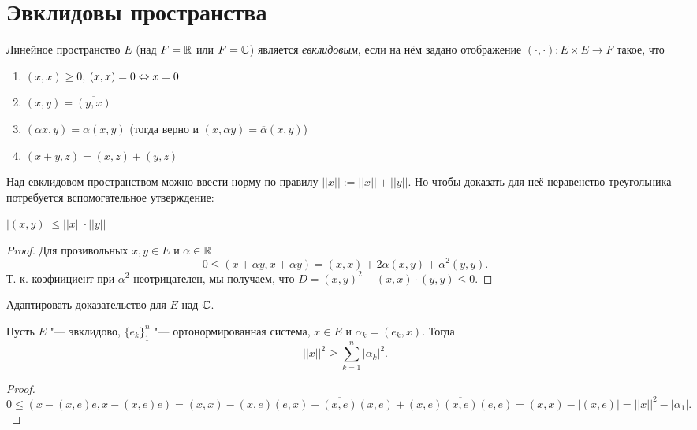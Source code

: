 \documentclass[main]{subfiles}
\begin{document}
\section{Эвклидовы пространства}
\begin{definition}
  Линейное пространство \( E \) (над \( F = \mathbb{R} \) или \( F = \mathbb{C} \))
  является \emph{евклидовым}, если на нём задано отображение
  \( (\cdot, \cdot) : E \times E \to F \) такое, что
  \begin{enumerate}
    \item \( (x, x) \ge 0 \), \( (x, x) = 0 \Leftrightarrow x = 0 \)
    \item \( (x, y) = \overline{(y, x)} \)
    \item \( (\alpha x, y) = \alpha (x, y) \)
      (тогда верно и \( (x, \alpha y) = \overline{\alpha} (x, y) \))
    \item \( (x + y, z) = (x, z) + (y, z) \)
  \end{enumerate}
\end{definition}

Над евклидовом пространством можно ввести норму
по правилу \( ||x|| := ||x|| + ||y|| \).
Но чтобы доказать для неё неравенство треугольника
потребуется вспомогательное утверждение:

\begin{lemma}
  \( |(x, y)| \le ||x|| \cdot ||y|| \)
\end{lemma}
\begin{proof}
  Для прозивольных \( x, y \in E \) и \( \alpha \in \mathbb{R} \)
  \[ 0 \le (x + \alpha y, x + \alpha y) =
  (x, x) + 2 \alpha (x, y) + \alpha^2 (y, y). \]
  Т. к. коэфиициент при \( \alpha^2 \) неотрицателен,
  мы получаем, что \( D = (x, y)^2 - (x, x) \cdot (y, y) \le 0 \).
\end{proof}

\begin{exercise}
  Адаптировать доказательство для \( E \) над \( \mathbb{C} \).
\end{exercise}

\begin{theorem}
  Пусть \( E \) "--- эвклидово, \( \{ e_k \}_1^n \) "--- ортонормированная система,
  \( x \in E \) и \( \alpha_k = (e_k, x) \). Тогда
  \[ ||x||^2 \ge \sum_{k = 1}^{n} |\alpha_k|^2. \]
\end{theorem}
\begin{proof}
  \[ 0 \le (x - (x, e) e, x - (x, e) e) =
    (x, x) - (x, e) (e, x) - \overline{(x, e)} (x, e) + (x, e)\overline{(x, e)}(e, e) =
  (x, x) - |(x, e)| = ||x||^2 - |\alpha_1|. \]
\end{proof}
\end{document}
